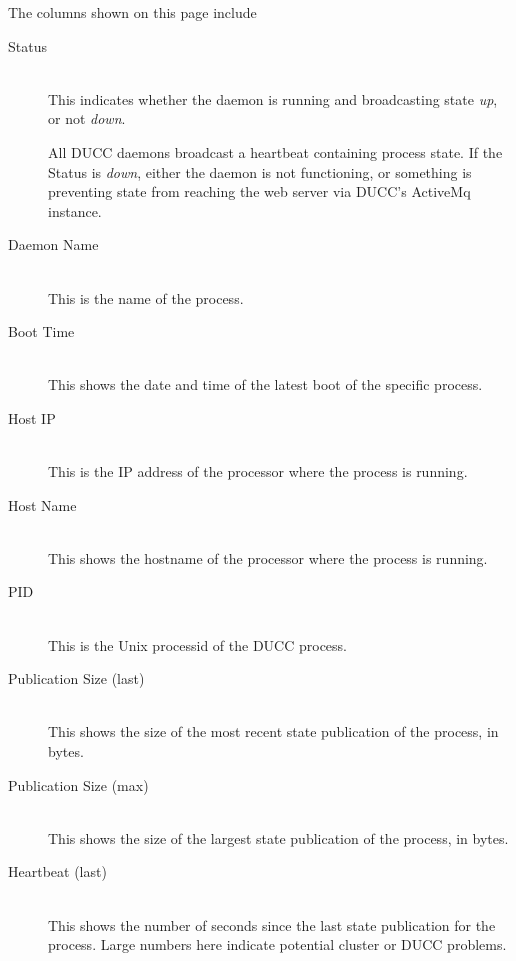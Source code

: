 The columns shown on this page include

   \begin{description}
      \item[Status] \hfill \\
        This indicates whether the daemon is running and broadcasting state {\em up},
        or not {\em down}.  
        
        All DUCC daemons broadcast a heartbeat containing process state.  If the Status
        is {\em down}, either the daemon is not functioning, or something is preventing
        state from reaching the web server via DUCC's ActiveMq instance.

      \item[Daemon Name] \hfill \\
        This is the name of the process.

      \item[Boot Time] \hfill \\ 
        This shows the date and time of the latest boot of the specific process.
          
      \item[Host IP] \hfill \\ 
        This is the IP address of the processor where the process is running.

      \item[Host Name] \hfill \\ 
        This shows the hostname of the processor where the process is running.

      \item[PID] \hfill \\ 
        This is the Unix processid of the DUCC process.


      \item[Publication Size (last)] \hfill \\ 
        This shows the size of the most recent state publication of the process, in bytes.

      \item[Publication Size (max)] \hfill \\ 
        This shows the size of the largest state publication of the process, in bytes.

      \item[Heartbeat (last)] \hfill \\ 
        This shows the number of seconds since the last state publication for the process. 
         Large numbers here indicate potential cluster or DUCC problems.


\end{description}
